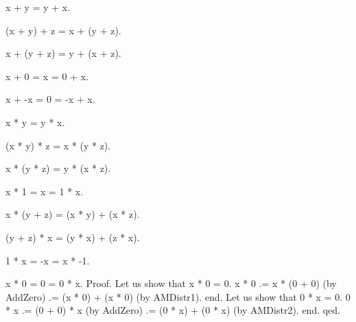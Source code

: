 \documentclass[a4paper,draft]{amsproc}
\begin{document}
\begin{ftlaxiom}[AddComm]
x + y = y + x.
\end{ftlaxiom}

\begin{ftlaxiom}[AddAsso]
(x + y) + z = x + (y + z).
\end{ftlaxiom}

\begin{ftlaxiom}[AddBubble]
x + (y + z) = y + (x + z).
\end{ftlaxiom}

\begin{ftlaxiom}[AddZero]
x + 0 = x = 0 + x.
\end{ftlaxiom}

\begin{ftlaxiom}[AddInvr]
x + -x = 0 = -x + x.
\end{ftlaxiom}

\begin{ftlaxiom}[MulComm]
x * y = y * x.
\end{ftlaxiom}

\begin{ftlaxiom}[MulAsso]
(x * y) * z = x * (y * z).
\end{ftlaxiom}

\begin{ftlaxiom}[MulBubble]
x * (y * z) = y * (x * z).
\end{ftlaxiom}

\begin{ftlaxiom}[MulUnit]
x * 1 = x = 1 * x.
\end{ftlaxiom}

\begin{ftlaxiom}[AMDistr1]
x * (y + z) = (x * y) + (x * z).
\end{ftlaxiom}

\begin{ftlaxiom}[AMDistr2]
(y + z) * x = (y * x) + (z * x).
\end{ftlaxiom}

\begin{ftlaxiom}[MulMnOne]
1 * x = -x = x * -1.
\end{ftlaxiom}

\begin{ftllemma}[MulZero]
x * 0 = 0 = 0 * x.
Proof.
    Let us show that x * 0 = 0.
    x * 0 .= x * (0 + 0) (by AddZero) .= (x * 0) + (x * 0) (by AMDistr1).
    end.
    Let us show that 0 * x = 0.
    0 * x .= (0 + 0) * x (by AddZero) .= (0 * x) + (0 * x) (by AMDistr2).
    end.
qed.
\end{ftllemma}
\end{document}
